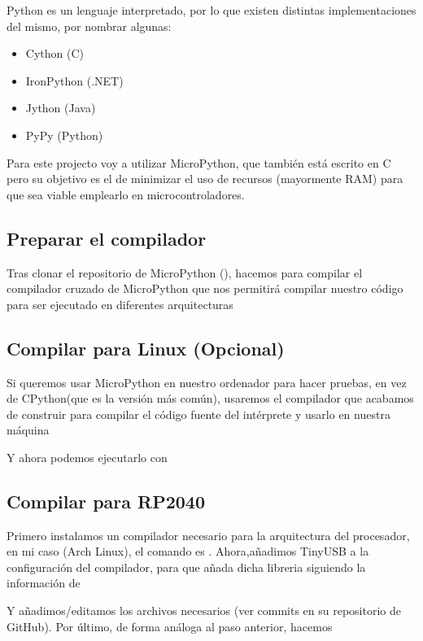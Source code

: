 Python es un lenguaje interpretado, por lo que existen distintas implementaciones del mismo, por nombrar algunas: 
\begin{itemize}
  \item Cython (C)
  \item IronPython (.NET)
  \item Jython (Java)
  \item PyPy (Python)
\end{itemize}
Para este projecto voy a utilizar MicroPython, que también está escrito en C pero su objetivo es el de minimizar el uso de recursos (mayormente RAM) para que sea viable emplearlo en microcontroladores.

\subsection{Preparar el compilador}
Tras clonar el repositorio de MicroPython (), hacemos  para compilar el compilador cruzado de MicroPython que nos permitirá compilar nuestro código para ser ejecutado en diferentes arquitecturas

\subsection{Compilar para Linux (Opcional)}
Si queremos usar MicroPython en nuestro ordenador para hacer pruebas, en vez de CPython(que es la versión más común), usaremos el compilador que acabamos de construir para compilar el código fuente del intérprete y usarlo en nuestra máquina 

Y ahora podemos ejecutarlo con 

\subsection{Compilar para RP2040}
Primero instalamos un compilador necesario para la arquitectura del procesador, en mi caso (Arch Linux), el comando es . \newline
Ahora,añadimos TinyUSB a la configuración del compilador, para que añada dicha libreria siguiendo la información de \textcite{tusb-rp2}

Y añadimos/editamos los archivos necesarios (ver commits en su repositorio de GitHub). Por último, de forma análoga al paso anterior, hacemos 
